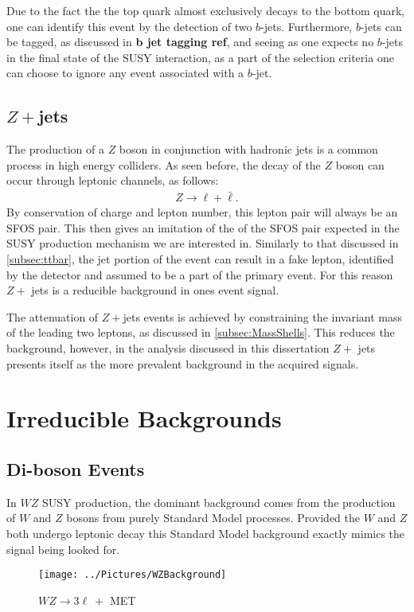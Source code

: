 Due to the fact the the top quark almost exclusively decays to the bottom quark, one can identify this event by the detection of two $b$-jets. 
Furthermore, $b$-jets can be tagged, as discussed in \textbf{\large b jet tagging ref}, and seeing as one expects no $b$-jets in the final state of the SUSY interaction, as a part of the selection criteria one can choose to ignore any event associated with a $b$-jet.

\subsection{$Z+$jets}
The production of a $Z$ boson in conjunction with hadronic jets is a common process in high energy colliders. 
As seen before, the decay of the $Z$ boson can occur through leptonic channels, as follows: 
\begin{align}
Z \rightarrow \ell + \bar{\ell}.
\end{align}
By conservation of charge and lepton number, this lepton pair will always be an SFOS pair. 
This then gives an imitation of the of the SFOS pair expected in the SUSY production mechanism we are interested in.
Similarly to that discussed in \ref{subsec:ttbar}, the jet portion of the event can result in a fake lepton, identified by the detector and assumed to be a part of the primary event.
For this reason $Z +$ jets is a reducible background in ones event signal.

The attenuation of $Z+$jets events is achieved by constraining the invariant mass of the leading two leptons, as discussed in \ref{subsec:MassShells}.
This reduces the background, however, in the analysis discussed in this dissertation $Z+$ jets presents itself as the more prevalent background in the acquired signals. 

\section{Irreducible Backgrounds}
\subsection{Di-boson Events}
In $WZ$ SUSY production, the dominant background comes from the production of $W$ and $Z$ bosons from purely Standard Model processes.
Provided the $W$ and $Z$ both undergo leptonic decay this Standard Model background exactly mimics the signal being looked for.

\begin{figure}[H] %
   \centering
   \texttt{[image: ../Pictures/WZBackground]} 
   \caption{$WZ \rightarrow 3\ell\ +$ MET}
   \label{fig:example}
\end{figure}

